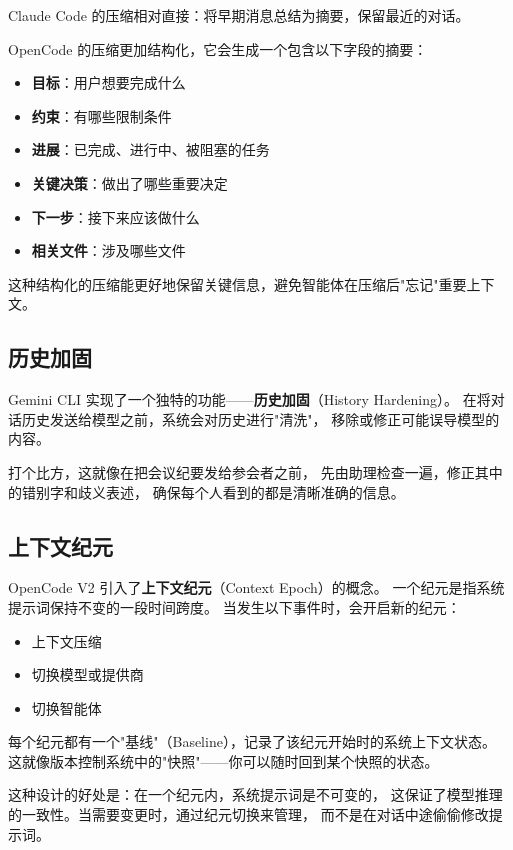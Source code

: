 Claude Code 的压缩相对直接：将早期消息总结为摘要，保留最近的对话。

OpenCode 的压缩更加结构化，它会生成一个包含以下字段的摘要：
\begin{itemize}
    \item \textbf{目标}：用户想要完成什么
    \item \textbf{约束}：有哪些限制条件
    \item \textbf{进展}：已完成、进行中、被阻塞的任务
    \item \textbf{关键决策}：做出了哪些重要决定
    \item \textbf{下一步}：接下来应该做什么
    \item \textbf{相关文件}：涉及哪些文件
\end{itemize}

这种结构化的压缩能更好地保留关键信息，避免智能体在压缩后"忘记"重要上下文。

\subsection{历史加固}

Gemini CLI 实现了一个独特的功能——\textbf{历史加固}（History Hardening）。
在将对话历史发送给模型之前，系统会对历史进行"清洗"，
移除或修正可能误导模型的内容。

打个比方，这就像在把会议纪要发给参会者之前，
先由助理检查一遍，修正其中的错别字和歧义表述，
确保每个人看到的都是清晰准确的信息。

\subsection{上下文纪元}

OpenCode V2 引入了\textbf{上下文纪元}（Context Epoch）的概念。
一个纪元是指系统提示词保持不变的一段时间跨度。
当发生以下事件时，会开启新的纪元：
\begin{itemize}
    \item 上下文压缩
    \item 切换模型或提供商
    \item 切换智能体
\end{itemize}

每个纪元都有一个"基线"（Baseline），记录了该纪元开始时的系统上下文状态。
这就像版本控制系统中的"快照"——你可以随时回到某个快照的状态。

这种设计的好处是：在一个纪元内，系统提示词是不可变的，
这保证了模型推理的一致性。当需要变更时，通过纪元切换来管理，
而不是在对话中途偷偷修改提示词。

